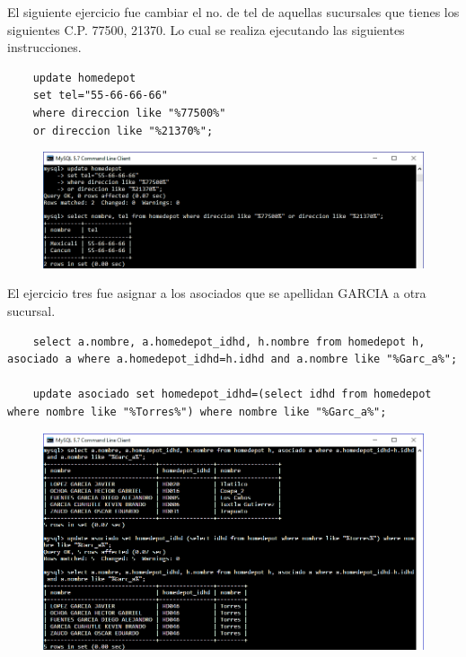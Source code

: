 \documentclass[12pt, titlepage]{article}
\begin{document}
	El siguiente ejercicio fue cambiar el no. de tel de aquellas sucursales que tienes los siguientes C.P. 77500, 21370. Lo cual se realiza ejecutando las siguientes instrucciones.
	\begin{lstlisting}
	update homedepot
	set tel="55-66-66-66" 
	where direccion like "%77500%" 
	or direccion like "%21370%";
	\end{lstlisting}
	\begin{figure}[H]
		\begin{center}
			\includegraphics[width=\textwidth]{img/tres.png}
			\label{fig:tres}
		\end{center}
	\end{figure}
	
	El ejercicio tres fue asignar a los asociados que se apellidan GARCIA a otra sucursal.
	\begin{lstlisting}
	select a.nombre, a.homedepot_idhd, h.nombre	from homedepot h, asociado a where a.homedepot_idhd=h.idhd and a.nombre like "%Garc_a%";
	
	update asociado set homedepot_idhd=(select idhd from homedepot where nombre like "%Torres%") where nombre like "%Garc_a%";
	\end{lstlisting}
	\begin{figure}[H]
		\begin{center}
			\includegraphics[width=\textwidth]{img/cuatro.png}
			\label{fig:cuatro}
		\end{center}
	\end{figure}
	
\end{document}
